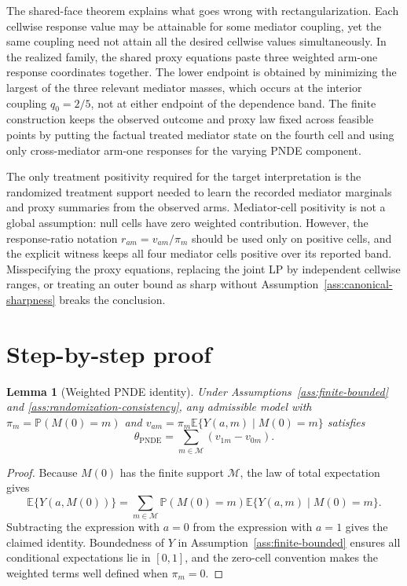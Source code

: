 \documentclass[11pt]{article}
\newcommand{\E}{\mathbb{E}}
\renewcommand{\Pr}{\mathbb{P}}
\theoremstyle{definition}
\theoremstyle{plain}
\newtheorem{lemma}{Lemma}
\theoremstyle{remark}
\begin{document}
The shared-face theorem explains what goes wrong with rectangularization.
Each cellwise response value may be attainable for some mediator coupling, yet
the same coupling need not attain all the desired cellwise values
simultaneously.  In the realized family, the shared proxy equations paste
three weighted arm-one response coordinates together.  The lower endpoint is
obtained by minimizing the largest of the three relevant mediator masses,
which occurs at the interior coupling \(q_0=2/5\), not at either endpoint of
the dependence band.  The finite construction keeps the observed outcome and
proxy law fixed across feasible points by putting the factual treated mediator
state on the fourth cell and using only cross-mediator arm-one responses for
the varying PNDE component.

The only treatment positivity required for the target interpretation is the
randomized treatment support needed to learn the recorded mediator marginals
and proxy summaries from the observed arms.  Mediator-cell positivity is not a
global assumption: null cells have zero weighted contribution.  However, the
response-ratio notation \(r_{am}=v_{am}/\pi_m\) should be used only on positive
cells, and the explicit witness keeps all four mediator cells positive over
its reported band.  Misspecifying the proxy equations, replacing the joint LP
by independent cellwise ranges, or treating an outer bound as sharp without
Assumption~\ref{ass:canonical-sharpness} breaks the conclusion.

\section{Step-by-step proof}
\begin{lemma}[Weighted PNDE identity]\label{lem:weighted-pnde}
Under Assumptions~\ref{ass:finite-bounded} and
\ref{ass:randomization-consistency}, any admissible model with
\(\pi_m=\Pr(M(0)=m)\) and
\(v_{am}=\pi_m\E\{Y(a,m)\mid M(0)=m\}\) satisfies
\[
  \theta_{\mathrm{PNDE}}=\sum_{m\in\mathcal M}(v_{1m}-v_{0m}).
\]
\end{lemma}

\begin{proof}
Because \(M(0)\) has the finite support \(\mathcal M\),
the law of total expectation gives
\[
  \E\{Y(a,M(0))\}
  =
  \sum_{m\in\mathcal M}
    \Pr(M(0)=m)\E\{Y(a,m)\mid M(0)=m\}.
\]
Subtracting the expression with \(a=0\) from the expression with \(a=1\)
gives the claimed identity.  Boundedness of \(Y\) in
Assumption~\ref{ass:finite-bounded} ensures all conditional expectations lie
in \([0,1]\), and the zero-cell convention makes the weighted terms well
defined when \(\pi_m=0\).
\end{proof}
\end{document}
